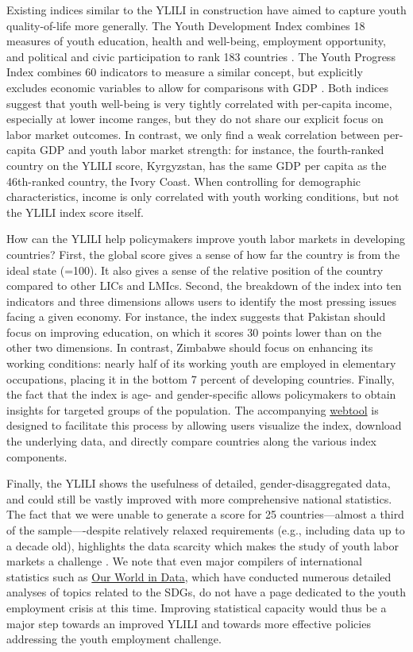 \documentclass[
  a4paper, twoside, 12pt]{book}
\begin{document}
Existing indices similar to the YLILI in construction have aimed to capture youth quality-of-life more generally. The Youth Development Index combines 18 measures of youth education, health and well-being, employment opportunity, and political and civic participation to rank 183 countries \autocite{sen2016}. The Youth Progress Index combines 60 indicators to measure a similar concept, but explicitly excludes economic variables to allow for comparisons with GDP \autocite{lisney2018}. Both indices suggest that youth well-being is very tightly correlated with per-capita income, especially at lower income ranges, but they do not share our explicit focus on labor market outcomes. In contrast, we only find a weak correlation between per-capita GDP and youth labor market strength: for instance, the fourth-ranked country on the YLILI score, Kyrgyzstan, has the same GDP per capita as the 46th-ranked country, the Ivory Coast. When controlling for demographic characteristics, income is only correlated with youth working conditions, but not the YLILI index score itself.

How can the YLILI help policymakers improve youth labor markets in developing countries? First, the global score gives a sense of how far the country is from the ideal state (=100). It also gives a sense of the relative position of the country compared to other LICs and LMIcs. Second, the breakdown of the index into ten indicators and three dimensions allows users to identify the most pressing issues facing a given economy. For instance, the index suggests that Pakistan should focus on improving education, on which it scores 30 points lower than on the other two dimensions. In contrast, Zimbabwe should focus on enhancing its working conditions: nearly half of its working youth are employed in elementary occupations, placing it in the bottom 7 percent of developing countries. Finally, the fact that the index is age- and gender-specific allows policymakers to obtain insights for targeted groups of the population. The accompanying \href{https://nadel.shinyapps.io/ylili}{webtool} is designed to facilitate this process by allowing users visualize the index, download the underlying data, and directly compare countries along the various index components.

Finally, the YLILI shows the usefulness of detailed, gender-disaggregated data, and could still be vastly improved with more comprehensive national statistics. The fact that we were unable to generate a score for 25 countries---almost a third of the sample----despite relatively relaxed requirements (e.g., including data up to a decade old), highlights the data scarcity which makes the study of youth labor markets a challenge \autocite{jerven2013}. We note that even major compilers of international statistics such as \href{https://ourworldindata.org/}{Our World in Data}, which have conducted numerous detailed analyses of topics related to the SDGs, do not have a page dedicated to the youth employment crisis at this time. Improving statistical capacity would thus be a major step towards an improved YLILI and towards more effective policies addressing the youth employment challenge.
\end{document}

